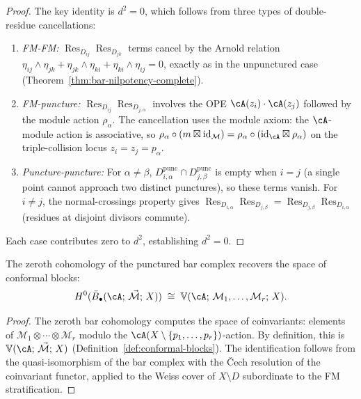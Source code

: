 \begin{proof}
The key identity is $d^2 = 0$, which follows from
three types of double-residue cancellations:
\begin{enumerate}
\item \emph{FM-FM:} $\operatorname{Res}_{D_{ij}}
  \operatorname{Res}_{D_{jk}}$ terms cancel by the Arnold
  relation $\eta_{ij} \wedge \eta_{jk} + \eta_{jk} \wedge
  \eta_{ki} + \eta_{ki} \wedge \eta_{ij} = 0$, exactly as
  in the unpunctured case
  (Theorem~\ref{thm:bar-nilpotency-complete}).
\item \emph{FM-puncture:} $\operatorname{Res}_{D_{ij}}
  \operatorname{Res}_{D_{j,\alpha}}$ involves the OPE
  $\cA(z_i) \cdot \cA(z_j)$ followed by the module action
  $\rho_\alpha$.  The cancellation uses the module axiom:
  the $\cA$-module action is associative, so
  $\rho_\alpha \circ (m \boxtimes \mathrm{id}_{\mathcal{M}})
  = \rho_\alpha \circ (\mathrm{id}_\cA \boxtimes \rho_\alpha)$
  on the triple-collision locus $z_i = z_j = p_\alpha$.
\item \emph{Puncture-puncture:} For $\alpha \neq \beta$,
  $D_{i,\alpha}^{\mathrm{punc}} \cap D_{j,\beta}^{\mathrm{punc}}$
  is empty when $i = j$ (a single point cannot approach two
  distinct punctures), so these terms vanish.  For $i \neq j$,
  the normal-crossings property gives
  $\operatorname{Res}_{D_{i,\alpha}}
  \operatorname{Res}_{D_{j,\beta}}
  = \operatorname{Res}_{D_{j,\beta}}
  \operatorname{Res}_{D_{i,\alpha}}$
  (residues at disjoint divisors commute).
\end{enumerate}
Each case contributes zero to $d^2$, establishing
$d^2 = 0$.
\end{proof}

\begin{corollary}
\label{cor:conformal-blocks-punctured-bar}
The zeroth cohomology of the punctured bar complex recovers
the space of conformal blocks:
\[
H^0(\bar{B}_\bullet(\cA;\, \vec{\mathcal{M}};\, X))
\;\cong\;
\mathbb{V}(\cA;\, \mathcal{M}_1, \ldots, \mathcal{M}_r;\, X).
\]
\end{corollary}

\begin{proof}
The zeroth bar cohomology computes the space of coinvariants:
elements of $\mathcal{M}_1 \otimes \cdots \otimes \mathcal{M}_r$
modulo the $\cA(X \setminus \{p_1, \ldots, p_r\})$-action.
By definition, this is $\mathbb{V}(\cA;\, \vec{\mathcal{M}};\, X)$
(Definition~\ref{def:conformal-blocks}).
The identification follows from the quasi-isomorphism
of the bar complex with the Čech resolution of the
coinvariant functor, applied to the Weiss cover
of $X \setminus D$ subordinate to the FM stratification.
\end{proof}

